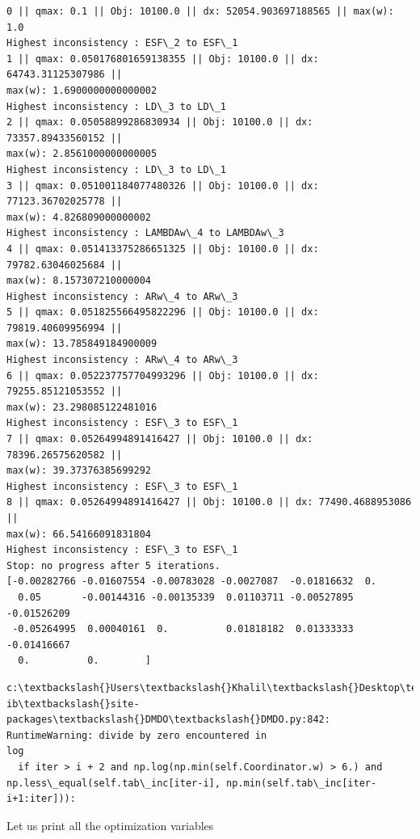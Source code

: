 \documentclass[11pt]{article}
\begin{document}
    \begin{Verbatim}[commandchars=\\\{\}]
0 || qmax: 0.1 || Obj: 10100.0 || dx: 52054.903697188565 || max(w): 1.0
Highest inconsistency : ESF\_2 to ESF\_1
1 || qmax: 0.050176801659138355 || Obj: 10100.0 || dx: 64743.31125307986 ||
max(w): 1.6900000000000002
Highest inconsistency : LD\_3 to LD\_1
2 || qmax: 0.05058899286830934 || Obj: 10100.0 || dx: 73357.89433560152 ||
max(w): 2.8561000000000005
Highest inconsistency : LD\_3 to LD\_1
3 || qmax: 0.051001184077480326 || Obj: 10100.0 || dx: 77123.36702025778 ||
max(w): 4.826809000000002
Highest inconsistency : LAMBDAw\_4 to LAMBDAw\_3
4 || qmax: 0.051413375286651325 || Obj: 10100.0 || dx: 79782.63046025684 ||
max(w): 8.157307210000004
Highest inconsistency : ARw\_4 to ARw\_3
5 || qmax: 0.051825566495822296 || Obj: 10100.0 || dx: 79819.40609956994 ||
max(w): 13.785849184900009
Highest inconsistency : ARw\_4 to ARw\_3
6 || qmax: 0.052237757704993296 || Obj: 10100.0 || dx: 79255.85121053552 ||
max(w): 23.298085122481016
Highest inconsistency : ESF\_3 to ESF\_1
7 || qmax: 0.05264994891416427 || Obj: 10100.0 || dx: 78396.26575620582 ||
max(w): 39.37376385699292
Highest inconsistency : ESF\_3 to ESF\_1
8 || qmax: 0.05264994891416427 || Obj: 10100.0 || dx: 77490.4688953086 ||
max(w): 66.54166091831804
Highest inconsistency : ESF\_3 to ESF\_1
Stop: no progress after 5 iterations.
[-0.00282766 -0.01607554 -0.00783028 -0.0027087  -0.01816632  0.
  0.05       -0.00144316 -0.00135339  0.01103711 -0.00527895 -0.01526209
 -0.05264995  0.00040161  0.          0.01818182  0.01333333 -0.01416667
  0.          0.        ]
    \end{Verbatim}

    \begin{Verbatim}[commandchars=\\\{\}]
c:\textbackslash{}Users\textbackslash{}Khalil\textbackslash{}Desktop\textbackslash{}Documents\textbackslash{}MECH\_559\_material\textbackslash{}MECH559\_notebooks\textbackslash{}.env.win\textbackslash{}l
ib\textbackslash{}site-packages\textbackslash{}DMDO\textbackslash{}DMDO.py:842: RuntimeWarning: divide by zero encountered in
log
  if iter > i + 2 and np.log(np.min(self.Coordinator.w) > 6.) and
np.less\_equal(self.tab\_inc[iter-i], np.min(self.tab\_inc[iter-i+1:iter])):
    \end{Verbatim}

    Let us print all the optimization variables
\end{document}

